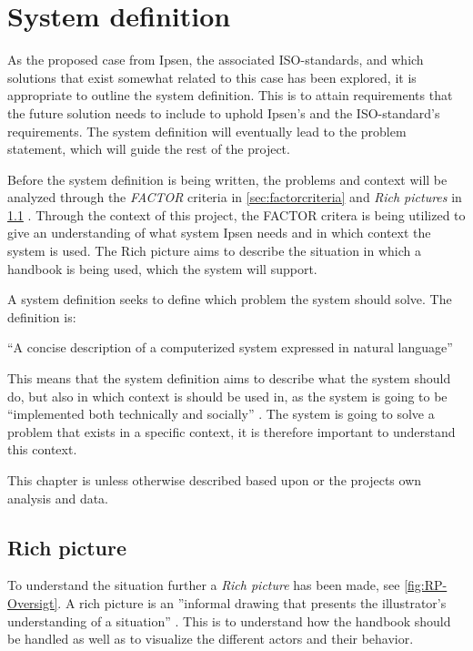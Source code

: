 \section{System definition}\label{sec:SystemDefinition}
As the proposed case from Ipsen, the associated ISO-standards, and which solutions that exist somewhat related to this case has been explored, it is appropriate to outline the system definition.
This is to attain requirements that the future solution needs to include to uphold Ipsen's and the ISO-standard's requirements.
The system definition will eventually lead to the problem statement, which will guide the rest of the project.

Before the system definition is being written, the problems and context will be analyzed through the \textit{FACTOR} criteria in \cref{sec:factorcriteria} and \textit{Rich pictures} in \cref{sec:richpictures} \citep{Rod-Aalborg}.
Through the context of this project, the FACTOR critera is being utilized to give an understanding of what system Ipsen needs and in which context the system is used.
The Rich picture aims to describe the situation in which a handbook is being used, which the system will support.


A system definition seeks to define which problem the system should solve.
The definition is: \citep[p.~24]{Rod-Aalborg}

\begin{defn}
“A concise description of a computerized system expressed in natural language”
\end{defn}

This means that the system definition aims to describe what the system should do, but also in which context is should be used in, as the system is going to be “implemented both technically and socially” \citep[p.~23]{Rod-Aalborg}.
The system is going to solve a problem that exists in a specific context, it is therefore important to understand this context.

This chapter is unless otherwise described based upon \cite{Rod-Aalborg} or the projects own analysis and data.

\subsection{Rich picture} \label{sec:richpictures}

To understand the situation further a \textit{Rich picture} has been made, see \cref{fig:RP-Oversigt}. A rich picture is an ''informal drawing that presents the illustrator's understanding of a situation'' \citep[~p. 26]{Rod-Aalborg}.
This is to understand how the handbook should be handled as well as to visualize the different actors and their behavior.


